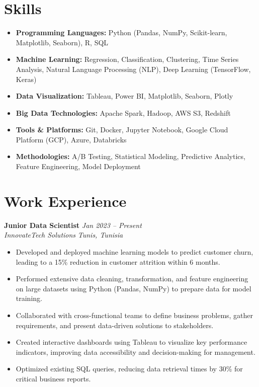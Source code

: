 \documentclass[10pt, letterpaper]{article} %
\begin{document}
\section*{Skills}
\begin{itemize}
    \item \textbf{Programming Languages:} Python (Pandas, NumPy, Scikit-learn, Matplotlib, Seaborn), R, SQL
    \item \textbf{Machine Learning:} Regression, Classification, Clustering, Time Series Analysis, Natural Language Processing (NLP), Deep Learning (TensorFlow, Keras)
    \item \textbf{Data Visualization:} Tableau, Power BI, Matplotlib, Seaborn, Plotly
    \item \textbf{Big Data Technologies:} Apache Spark, Hadoop, AWS S3, Redshift
    \item \textbf{Tools \& Platforms:} Git, Docker, Jupyter Notebook, Google Cloud Platform (GCP), Azure, Databricks
    \item \textbf{Methodologies:} A/B Testing, Statistical Modeling, Predictive Analytics, Feature Engineering, Model Deployment
\end{itemize}

\section*{Work Experience}

\textbf{Junior Data Scientist} \hfill \textit{Jan 2023 -- Present} \\
\textit{InnovateTech Solutions} \hfill \textit{Tunis, Tunisia}
\begin{itemize}
    \item Developed and deployed machine learning models to predict customer churn, leading to a 15\% reduction in customer attrition within 6 months.
    \item Performed extensive data cleaning, transformation, and feature engineering on large datasets using Python (Pandas, NumPy) to prepare data for model training.
    \item Collaborated with cross-functional teams to define business problems, gather requirements, and present data-driven solutions to stakeholders.
    \item Created interactive dashboards using Tableau to visualize key performance indicators, improving data accessibility and decision-making for management.
    \item Optimized existing SQL queries, reducing data retrieval times by 30\% for critical business reports.
\end{itemize}
\end{document}
